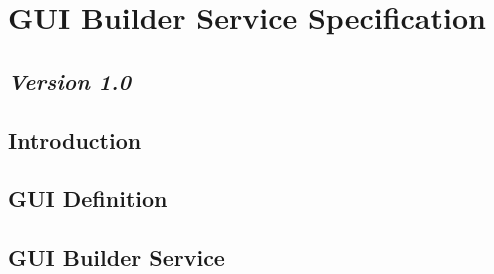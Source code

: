 \chapter{GUI Builder Service Specification}
\section*{\textit{Version 1.0}}
\section{Introduction}
\section{GUI Definition}
\section{GUI Builder Service}
\orgcishellserviceguibuilder{}
